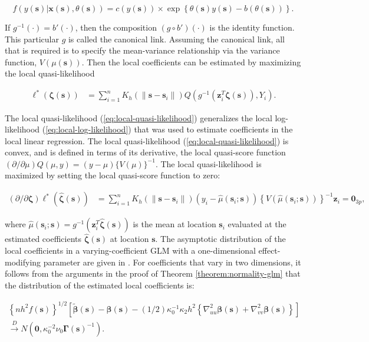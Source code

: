 \documentclass[authoryear,review, 12pt]{elsarticle}
\begin{document}
\[
f\left(y(\bm{s})|\bm{x}(\bm{s}),\theta(\bm{s})\right)=c\left(y(\bm{s})\right)\times\exp\left\{ \theta(\bm{s})y(\bm{s})-b\left(\theta(\bm{s})\right)\right\} .
\]


If $g^{-1}(\cdot)=b'(\cdot)$, then the composition $(g\circ b')(\cdot)$
is the identity function. This particular $g$ is called the canonical
link. Assuming the canonical link, all that is required is to specify
the mean-variance relationship via the variance function, $V\left(\mu(\bm{s})\right)$.
Then the local coefficients can be estimated by maximizing the local
quasi-likelihood 

\begin{align}
\mathcal{\ell}^{*}\left(\bm{\zeta}(\bm{s})\right) & =\sum_{i=1}^{n}K_{h}\left(\|\bm{s}-\bm{s}_{i}\|\right)Q\left(g^{-1}\left(\bm{z}_{i}^{T}\bm{\zeta}(\bm{s})\right),Y_{i}\right).\label{eq:local-quasi-likelihood}
\end{align}


The local quasi-likelihood (\ref{eq:local-quasi-likelihood}) generalizes
the local log-likelihood (\ref{eq:local-log-likelihood}) that was
used to estimate coefficients in the local linear regression. The
local quasi-likelihood (\ref{eq:local-quasi-likelihood}) is convex,
and is defined in terms of its derivative, the local quasi-score function
$\left(\partial/\partial\mu\right)Q(\mu,y)=(y-\mu)\{V(\mu)\}^{-1}$.
The local quasi-likelihood is maximized by setting the local quasi-score
function to zero:

\begin{align}
(\partial/\partial\bm{\zeta})\mathcal{\ell}^{*}\left(\hat{\bm{\zeta}}(\bm{s})\right) & =\sum_{i=1}^{n}K_{h}\left(\|\bm{s}-\bm{s}_{i}\|\right)\left(y_{i}-\hat{\mu}(\bm{s}_{i};\bm{s})\right)\left\{ V\left(\hat{\mu}(\bm{s}_{i};\bm{s})\right)\right\} ^{-1}\bm{z}_{i}=\bm{0}_{3p},
\end{align}


where $\hat{\mu}(\bm{s}_{i};\bm{s})=g^{-1}\left(\bm{z}_{i}^{T}\hat{\bm{\zeta}}(\bm{s})\right)$
is the mean at location $\bm{s}_{i}$ evaluated at the estimated coefficients
$\hat{\bm{\zeta}}(\bm{s})$ at location $\bm{s}$. The asymptotic
distribution of the local coefficients in a varying-coefficient GLM
with a one-dimensional effect-modifying parameter are given in \citet{Cai-Fan-Li-2000}.
For coefficients that vary in two dimensions, it follows from the
arguments in the proof of Theorem \ref{theorem:normality-glm} that
the distribution of the estimated local coefficients is:

\begin{gather*}
\left\{ nh^{2}f(\bm{s})\right\} ^{1/2}\left[\tilde{\bm{\beta}}(\bm{s})-\bm{\beta}(\bm{s})-(1/2)\kappa_{0}^{-1}\kappa_{2}h^{2}\left\{ \nabla_{uu}^{2}\bm{\beta}(\bm{s})+\nabla_{vv}^{2}\bm{\beta}(\bm{s})\right\} \right]\\
\xrightarrow{{D}}N\left(\bm{0},\kappa_{0}^{-2}\nu_{0}\bm{\Gamma}(\bm{s})^{-1}\right).
\end{gather*}
\end{document}
